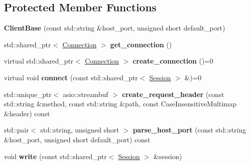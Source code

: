 \subsection*{Protected Member Functions}
\begin{DoxyCompactItemize}
\item 
{\bfseries Client\+Base} (const std\+::string \&host\+\_\+port, unsigned short default\+\_\+port)\hypertarget{classSimpleWeb_1_1ClientBase_a4a74d44c9df44d0d469ad453bdac43bf}{}\label{classSimpleWeb_1_1ClientBase_a4a74d44c9df44d0d469ad453bdac43bf}

\item 
std\+::shared\+\_\+ptr$<$ \hyperlink{classSimpleWeb_1_1ClientBase_1_1Connection}{Connection} $>$ {\bfseries get\+\_\+connection} ()\hypertarget{classSimpleWeb_1_1ClientBase_af69804b6da3fbd083be6c1fc8b8b72e7}{}\label{classSimpleWeb_1_1ClientBase_af69804b6da3fbd083be6c1fc8b8b72e7}

\item 
virtual std\+::shared\+\_\+ptr$<$ \hyperlink{classSimpleWeb_1_1ClientBase_1_1Connection}{Connection} $>$ {\bfseries create\+\_\+connection} ()=0\hypertarget{classSimpleWeb_1_1ClientBase_aad37706d6aff9f53cb34c129c27a9fdb}{}\label{classSimpleWeb_1_1ClientBase_aad37706d6aff9f53cb34c129c27a9fdb}

\item 
virtual void {\bfseries connect} (const std\+::shared\+\_\+ptr$<$ \hyperlink{classSimpleWeb_1_1ClientBase_1_1Session}{Session} $>$ \&)=0\hypertarget{classSimpleWeb_1_1ClientBase_aaced51a42dc673214f323b7edcc304b6}{}\label{classSimpleWeb_1_1ClientBase_aaced51a42dc673214f323b7edcc304b6}

\item 
std\+::unique\+\_\+ptr$<$ asio\+::streambuf $>$ {\bfseries create\+\_\+request\+\_\+header} (const std\+::string \&method, const std\+::string \&path, const Case\+Insensitive\+Multimap \&header) const \hypertarget{classSimpleWeb_1_1ClientBase_ab0952dbc345306de997e4432a0d9157a}{}\label{classSimpleWeb_1_1ClientBase_ab0952dbc345306de997e4432a0d9157a}

\item 
std\+::pair$<$ std\+::string, unsigned short $>$ {\bfseries parse\+\_\+host\+\_\+port} (const std\+::string \&host\+\_\+port, unsigned short default\+\_\+port) const \hypertarget{classSimpleWeb_1_1ClientBase_aa5400b1c44ab37287863ff330975c94f}{}\label{classSimpleWeb_1_1ClientBase_aa5400b1c44ab37287863ff330975c94f}

\item 
void {\bfseries write} (const std\+::shared\+\_\+ptr$<$ \hyperlink{classSimpleWeb_1_1ClientBase_1_1Session}{Session} $>$ \&session)\hypertarget{classSimpleWeb_1_1ClientBase_a2d84713eb83ab8b77a1663f57f692b02}{}\label{classSimpleWeb_1_1ClientBase_a2d84713eb83ab8b77a1663f57f692b02}


\end{DoxyCompactItemize}
